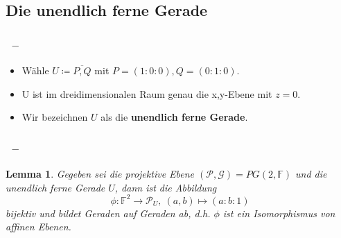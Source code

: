 \documentclass{beamer}
\theoremstyle{plain}
\newtheorem{lem}[thm]{Lemma}
\theoremstyle{definition}
\theoremstyle{rem}
\begin{document}
\subsection{Die unendlich ferne Gerade}

\begin{frame}
\frametitle{\insertsection~--~\insertsubsection}
\begin{itemize}[<+->]
	\item Wähle $U\coloneqq\overline{P,Q}$ mit $P=(1:0:0),Q=(0:1:0)$.
	\item U ist im dreidimensionalen Raum genau die x,y-Ebene mit $z=0$.

\begin{figure}[H]
\end{figure}
	\item Wir bezeichnen $U$ als die \textbf{unendlich ferne Gerade}.
\end{itemize}
\end{frame}


\begin{frame}
\frametitle{\insertsection~--~\insertsubsection}
\begin{lem}
    Gegeben sei die projektive Ebene $(\mathcal{P}, \mathcal{G}) = PG(2,\mathbb{F})$ und die unendlich ferne Gerade $U$, dann ist die Abbildung
    \begin{equation*}
        \phi: \mathbb{F}^2 \rightarrow \mathcal{P}_U,\ (a,b) \mapsto (a:b:1)
    \end{equation*}
    bijektiv und bildet Geraden auf Geraden ab, d.h. $\phi$ ist ein Isomorphismus von affinen Ebenen. 
\end{lem}
\end{frame}
\end{document}
